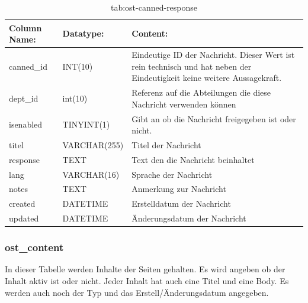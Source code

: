 \begin{table}[h]
	\begin{tabular}{|p{3.5cm}|p{4cm}|p{6.2cm}|}
		\hline
		\textbf{Column Name:} & \textbf{Datatype:} & \textbf{Content:}\\
		\hline
		canned\_id & INT(10) & Eindeutige ID der Nachricht. Dieser Wert ist rein technisch und hat  neben der Eindeutigkeit keine weitere 
		Aussagekraft.\\
		\hline
		dept\_id & int(10) & Referenz auf die Abteilungen die diese Nachricht verwenden können\\
		\hline
		isenabled & TINYINT(1) & Gibt an ob die Nachricht freigegeben ist oder nicht.\\
		\hline
		titel & VARCHAR(255) & Titel der Nachricht\\
		\hline
		response & TEXT & Text den die Nachricht beinhaltet\\
		\hline
		lang & VARCHAR(16) & Sprache der Nachricht\\
		\hline
		notes & TEXT & Anmerkung zur Nachricht\\
		\hline
		created & DATETIME & Erstelldatum der Nachricht\\
		\hline
		updated & DATETIME & Änderungsdatum der Nachricht\\
		\hline
	\end{tabular}
	\caption{tab:ost-canned-response}
\end{table}
\label{tab:ost_canned_response}

\newpage

\subsubsection{ost\_content}

In dieser Tabelle werden Inhalte der Seiten gehalten. Es wird angeben ob der Inhalt aktiv ist oder nicht. Jeder Inhalt hat auch eine Titel und eine Body. Es werden auch noch der Typ und das Erstell/Änderungsdatum angegeben.

